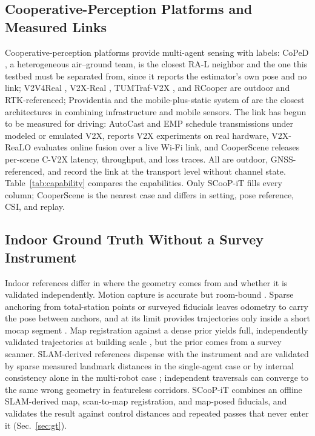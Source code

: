 \documentclass[journal]{IEEEtran}
\begin{document}
\subsection{Cooperative-Perception Platforms and Measured Links}
Cooperative-perception platforms provide multi-agent sensing with
labels: CoPeD \cite{coped}, a heterogeneous air--ground team, is the
closest RA-L neighbor and the one this testbed must be separated from,
since it reports the estimator's own pose and no link; V2V4Real
\cite{v2v4real}, V2X-Real \cite{v2xreal}, TUMTraf-V2X
\cite{zimmer2024tumtrafv2x}, and RCooper \cite{hao2024rcooper} are
outdoor and RTK-referenced; Providentia \cite{krammer2022providentia}
and the mobile-plus-static system of \cite{jimenez2011integrated} are
the closest architectures in combining infrastructure and mobile
sensors. The link has begun to be measured for driving: AutoCast
\cite{qiu2022autocast} and EMP \cite{zhang2021emp} schedule
transmissions under modeled or emulated V2X, \cite{hawlader2024v2xexp}
reports V2X experiments on real hardware, V2X-ReaLO \cite{v2xrealo}
evaluates online fusion over a live Wi-Fi link, and CooperScene
\cite{cooperscene} releases per-scene C-V2X latency, throughput, and
loss traces. All are outdoor, GNSS-referenced, and record the link at
the transport level without channel state.
Table~\ref{tab:capability} compares the capabilities. Only SCooP-iT
fills every column; CooperScene is the nearest case and differs in
setting, pose reference, CSI, and replay.



\subsection{Indoor Ground Truth Without a Survey Instrument}
\label{sec:gt_related}
Indoor references differ in where the geometry comes from and whether
it is validated independently. Motion capture is accurate but
room-bound \cite{utias,m2dgr}. Sparse anchoring from total-station
points \cite{hilti2022} or surveyed fiducials \cite{airmuseum} leaves
odometry to carry the pose between anchors, and at its limit provides
trajectories only inside a short mocap segment \cite{s3e}. Map
registration against a dense prior yields full, independently
validated trajectories at building scale \cite{subtmrs,lamar}, but the
prior comes from a survey scanner. SLAM-derived references dispense
with the instrument and are validated by sparse measured landmark
distances in the single-agent case \cite{incrowdvi} or by internal
consistency alone in the multi-robot case \cite{envodat}; independent
traversals can converge to the same wrong geometry in featureless
corridors. SCooP-iT combines an offline SLAM-derived map, scan-to-map
registration, and map-posed fiducials, and validates the result against
control distances and repeated passes that never enter it
(Sec.~\ref{sec:gt}).
\end{document}
